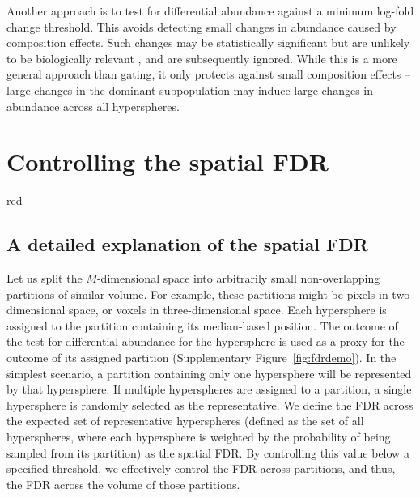 \documentclass{article}
\begin{document}
Another approach is to test for differential abundance against a minimum log-fold change threshold.
This avoids detecting small changes in abundance caused by composition effects.
Such changes may be statistically significant but are unlikely to be biologically relevant \cite{mccarthy2009treat}, and are subsequently ignored.
While this is a more general approach than gating, it only protects against small composition effects -- large changes in the dominant subpopulation may induce large changes in abundance across all hyperspheres.

\section{Controlling the spatial FDR}

\begin{color}{red}
\subsection{A detailed explanation of the spatial FDR}
Let us split the $M$-dimensional space into arbitrarily small non-overlapping partitions of similar volume.
For example, these partitions might be pixels in two-dimensional space, or voxels in three-dimensional space.
Each hypersphere is assigned to the partition containing its median-based position.
The outcome of the test for differential abundance for the hypersphere is used as a proxy for the outcome of its assigned partition (Supplementary Figure~\ref{fig:fdrdemo}).
In the simplest scenario, a partition containing only one hypersphere will be represented by that hypersphere.
If multiple hyperspheres are assigned to a partition, a single hypersphere is randomly selected as the representative.
We define the FDR across the expected set of representative hyperspheres (defined as the set of all hyperspheres, where each hypersphere is weighted by the probability of being sampled from its partition) as the spatial FDR.
By controlling this value below a specified threshold, we effectively control the FDR across partitions, and thus, the FDR across the volume of those partitions.


\end{color}
\end{document}
